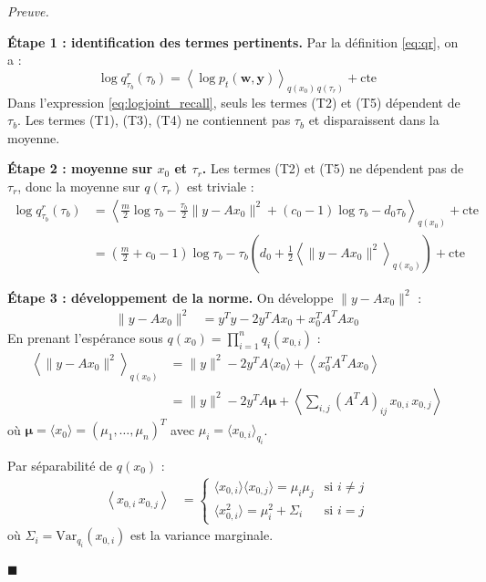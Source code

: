 \documentclass[12pt]{article}
\newcommand{\w}{\boldsymbol{w}}
\newcommand{\y}{\boldsymbol{y}}
\renewcommand{\qedsymbol}{$\blacksquare$}
\renewenvironment{proof}[1][\proofname]{%
  \par\medskip\noindent
  \textit{\color{proofgray}#1.}\enspace\ignorespaces
}{\hfill\qedsymbol\par\medskip}
\renewcommand{\proofname}{Preuve}
\begin{document}
\begin{proof}

\textbf{Étape 1 : identification des termes pertinents.} Par la définition \eqref{eq:qr}, on a :
\[
\log q_{\tau_b}^r(\tau_b) = \left\langle \log p_t(\w, \y) \right\rangle_{q(x_0)\, q(\tau_r)} + \mathrm{cte}
\]
Dans l'expression \eqref{eq:logjoint_recall}, seuls les termes (T2) et (T5) dépendent de $\tau_b$. Les termes (T1), (T3), (T4) ne contiennent pas $\tau_b$ et disparaissent dans la moyenne.

\textbf{Étape 2 : moyenne sur $x_0$ et $\tau_r$.} Les termes (T2) et (T5) ne dépendent pas de $\tau_r$, donc la moyenne sur $q(\tau_r)$ est triviale :
\begin{align}
    \log q_{\tau_b}^r(\tau_b) &= \left\langle \frac{m}{2}\log\tau_b - \frac{\tau_b}{2}\|y - Ax_0\|^2 + (c_0-1)\log\tau_b - d_0\tau_b \right\rangle_{q(x_0)} + \mathrm{cte} \nonumber\\[4pt]
    &= \left(\frac{m}{2} + c_0 - 1\right)\log\tau_b - \tau_b\left(d_0 + \frac{1}{2}\left\langle \|y - Ax_0\|^2 \right\rangle_{q(x_0)}\right) + \mathrm{cte} \label{eq:log_qr_taub}
\end{align}

\textbf{Étape 3 : développement de la norme.} On développe $\|y - Ax_0\|^2$ :
\begin{align}
    \|y - Ax_0\|^2 &= y^T y - 2y^T A x_0 + x_0^T A^T A x_0
\end{align}
En prenant l'espérance sous $q(x_0) = \prod_{i=1}^n q_i(x_{0,i})$ :
\begin{align}
    \left\langle \|y - Ax_0\|^2 \right\rangle_{q(x_0)} &= \|y\|^2 - 2y^T A \langle x_0 \rangle + \left\langle x_0^T A^T A x_0 \right\rangle \nonumber\\[4pt]
    &= \|y\|^2 - 2y^T A \boldsymbol{\mu} + \left\langle \sum_{i,j} (A^T A)_{ij}\, x_{0,i}\, x_{0,j} \right\rangle \label{eq:norm_expansion}
\end{align}
où $\boldsymbol{\mu} = \langle x_0 \rangle = (\mu_1, \ldots, \mu_n)^T$ avec $\mu_i = \langle x_{0,i} \rangle_{q_i}$.

Par séparabilité de $q(x_0)$ :
\begin{align}
    \left\langle x_{0,i}\, x_{0,j} \right\rangle &= \begin{cases}
        \langle x_{0,i} \rangle \langle x_{0,j} \rangle = \mu_i \mu_j & \text{si } i \neq j \\[4pt]
        \langle x_{0,i}^2 \rangle = \mu_i^2 + \Sigma_i & \text{si } i = j
    \end{cases}
\end{align}
où $\Sigma_i = \mathrm{Var}_{q_i}(x_{0,i})$ est la variance marginale.


\end{proof}
\end{document}
